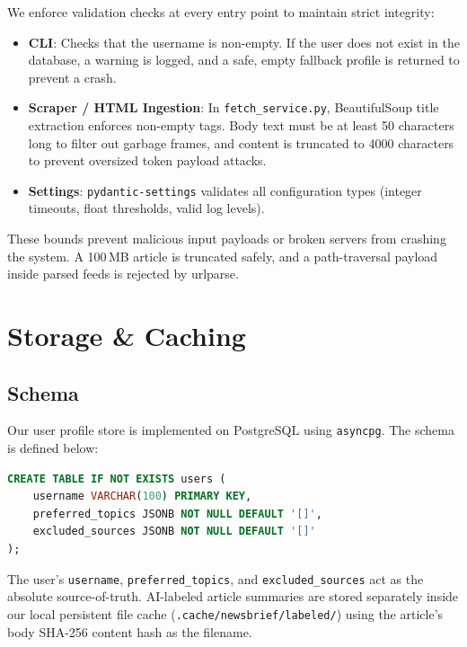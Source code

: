 \documentclass[11pt,a4paper]{article}
\begin{document}
We enforce validation checks at every entry point to maintain strict integrity:
\begin{itemize}
    \item \textbf{CLI}: Checks that the username is non-empty. If the user does not exist in the database, a warning is logged, and a safe, empty fallback profile is returned to prevent a crash.
    \item \textbf{Scraper / HTML Ingestion}: In \texttt{fetch\_service.py}, BeautifulSoup title extraction enforces non-empty tags. Body text must be at least 50 characters long to filter out garbage frames, and content is truncated to 4000 characters to prevent oversized token payload attacks.
    \item \textbf{Settings}: \texttt{pydantic-settings} validates all configuration types (integer timeouts, float thresholds, valid log levels).
\end{itemize}

These bounds prevent malicious input payloads or broken servers from crashing the system. A 100\,MB article is truncated safely, and a path-traversal payload inside parsed feeds is rejected by urlparse.

\section{Storage \& Caching}\label{sec:storage}

\subsection{Schema}

Our user profile store is implemented on PostgreSQL using \texttt{asyncpg}. The schema is defined below:

\begin{lstlisting}[language=SQL,numbers=none,basicstyle=\ttfamily\small,frame=single,backgroundcolor=\color{backcolour},rulecolor=\color{black!30}]
CREATE TABLE IF NOT EXISTS users (
    username VARCHAR(100) PRIMARY KEY,
    preferred_topics JSONB NOT NULL DEFAULT '[]',
    excluded_sources JSONB NOT NULL DEFAULT '[]'
);
\end{lstlisting}

The user's \texttt{username}, \texttt{preferred\_topics}, and \texttt{excluded\_sources} act as the absolute source-of-truth.
AI-labeled article summaries are stored separately inside our local persistent file cache (\texttt{.cache/newsbrief/labeled/}) using the article's body SHA-256 content hash as the filename.
\end{document}
